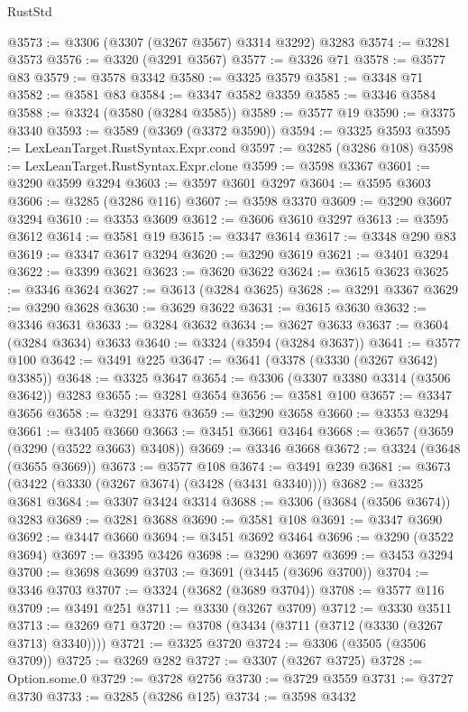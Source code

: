 \begin{lexlean}{RustStd}
\begin{coremodule}
@3573 := @3306 (@3307 (@3267 @3567) @3314 @3292) @3283
@3574 := @3281 @3573
@3576 := @3320 (@3291 @3567)
@3577 := @3326 @71
@3578 := @3577 @83
@3579 := @3578 @3342
@3580 := @3325 @3579
@3581 := @3348 @71
@3582 := @3581 @83
@3584 := @3347 @3582 @3359
@3585 := @3346 @3584
@3588 := @3324 (@3580 (@3284 @3585))
@3589 := @3577 @19
@3590 := @3375 @3340
@3593 := @3589 (@3369 (@3372 @3590))
@3594 := @3325 @3593
@3595 := LexLeanTarget.RustSyntax.Expr.cond
@3597 := @3285 (@3286 @108)
@3598 := LexLeanTarget.RustSyntax.Expr.clone
@3599 := @3598 @3367
@3601 := @3290 @3599 @3294
@3603 := @3597 @3601 @3297
@3604 := @3595 @3603
@3606 := @3285 (@3286 @116)
@3607 := @3598 @3370
@3609 := @3290 @3607 @3294
@3610 := @3353 @3609
@3612 := @3606 @3610 @3297
@3613 := @3595 @3612
@3614 := @3581 @19
@3615 := @3347 @3614
@3617 := @3348 @290 @83
@3619 := @3347 @3617 @3294
@3620 := @3290 @3619
@3621 := @3401 @3294
@3622 := @3399 @3621
@3623 := @3620 @3622
@3624 := @3615 @3623
@3625 := @3346 @3624
@3627 := @3613 (@3284 @3625)
@3628 := @3291 @3367
@3629 := @3290 @3628
@3630 := @3629 @3622
@3631 := @3615 @3630
@3632 := @3346 @3631
@3633 := @3284 @3632
@3634 := @3627 @3633
@3637 := @3604 (@3284 @3634) @3633
@3640 := @3324 (@3594 (@3284 @3637))
@3641 := @3577 @100
@3642 := @3491 @225
@3647 := @3641 (@3378 (@3330 (@3267 @3642) @3385))
@3648 := @3325 @3647
@3654 := @3306 (@3307 @3380 @3314 (@3506 @3642)) @3283
@3655 := @3281 @3654
@3656 := @3581 @100
@3657 := @3347 @3656
@3658 := @3291 @3376
@3659 := @3290 @3658
@3660 := @3353 @3294
@3661 := @3405 @3660
@3663 := @3451 @3661 @3464
@3668 := @3657 (@3659 (@3290 (@3522 @3663) @3408))
@3669 := @3346 @3668
@3672 := @3324 (@3648 (@3655 @3669))
@3673 := @3577 @108
@3674 := @3491 @239
@3681 := @3673 (@3422 (@3330 (@3267 @3674) (@3428 (@3431 @3340))))
@3682 := @3325 @3681
@3684 := @3307 @3424 @3314
@3688 := @3306 (@3684 (@3506 @3674)) @3283
@3689 := @3281 @3688
@3690 := @3581 @108
@3691 := @3347 @3690
@3692 := @3447 @3660
@3694 := @3451 @3692 @3464
@3696 := @3290 (@3522 @3694)
@3697 := @3395 @3426
@3698 := @3290 @3697
@3699 := @3453 @3294
@3700 := @3698 @3699
@3703 := @3691 (@3445 (@3696 @3700))
@3704 := @3346 @3703
@3707 := @3324 (@3682 (@3689 @3704))
@3708 := @3577 @116
@3709 := @3491 @251
@3711 := @3330 (@3267 @3709)
@3712 := @3330 @3511
@3713 := @3269 @71
@3720 := @3708 (@3434 (@3711 (@3712 (@3330 (@3267 @3713) @3340))))
@3721 := @3325 @3720
@3724 := @3306 (@3505 (@3506 @3709))
@3725 := @3269 @282
@3727 := @3307 (@3267 @3725)
@3728 := Option.some.{0}
@3729 := @3728 @2756
@3730 := @3729 @3559
@3731 := @3727 @3730
@3733 := @3285 (@3286 @125)
@3734 := @3598 @3432

\end{coremodule}
\end{lexlean}
